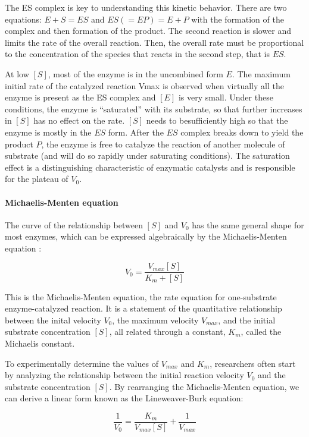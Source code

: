 The ES complex is key to understanding this kinetic behavior. There are two equations: $E+S=ES$ 
and $ES(=EP)=E+P$ with the formation of the complex and then formation of the product.
The second reaction is slower and limits the rate of the overall reaction. 
Then, the overall rate must be proportional to the concentration of the species that reacts in 
the second step, that is $ES$.

At low $[S]$, most of the enzyme is in the uncombined form $E$.
The maximum initial rate of the catalyzed reaction Vmax is observed when virtually all the enzyme 
is present as the ES complex and $[E]$ is very small.
Under these conditions, the enzyme is “saturated” with its substrate, so that further increases 
in $[S]$ has no effect on the rate. $[S]$ needs to besufficiently high so that the enzyme is 
mostly in the $ES$ form.
After the $ES$ complex breaks down to yield the product $P$, the enzyme is free to catalyze the reaction 
of another molecule of substrate (and will do so rapidly under saturating conditions). The saturation 
effect is a distinguishing characteristic of enzymatic catalysts and is responsible for the plateau 
of $V_0$.

\paragraph{Michaelis-Menten equation}

The curve of the relationship between $[S]$ and $V_0$ has the same general shape for most enzymes, 
which can be expressed algebraically by the Michaelis-Menten equation \cite{MichaelisMentenEq}:

$$
V_0=\frac{V_{max}[S]}{K_m+[S]}
$$

This is the Michaelis-Menten equation, the rate equation for one-substrate enzyme-catalyzed reaction.
It is a statement of the quantitative relationship between the inital velocity $V_0$, 
the maximum velocity $V_{max}$, and the initial substrate concentration $[S]$, all related through a 
constant, $K_m$, called the Michaelis constant.

To experimentally determine the values of $V_{max}$ and $K_m$, researchers often start by analyzing 
the relationship between the initial reaction velocity $V_0$ and the substrate concentration $[S]$. 
By rearranging the Michaelis-Menten equation, we can derive a linear form known as the Lineweaver-Burk 
equation:

$$
\frac{1}{V_0} = \frac{K_m}{V_{max}[S]} + \frac{1}{V_{max}}
$$

